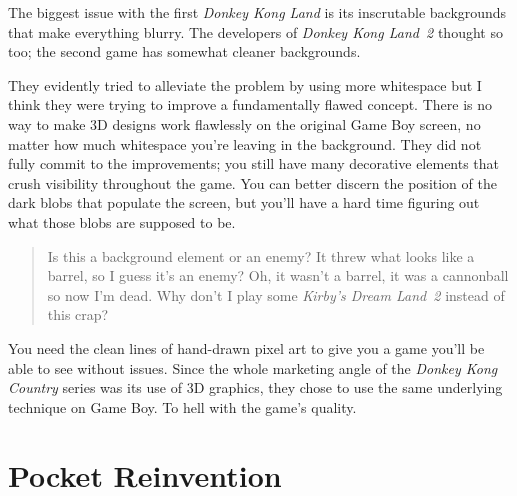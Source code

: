 \documentclass{book}
\let\oldcenter\center
\let\oldendcenter\endcenter
\renewenvironment{center}{\setlength\topsep{0pt}\oldcenter}{\oldendcenter}
\begin{document}
The biggest issue with the first \emph{Donkey Kong Land} is its inscrutable backgrounds that make everything blurry. The developers of \emph{Donkey Kong Land 2} thought so too; the second game has somewhat cleaner backgrounds.

\begin{center}
\vspace{8pt}
\quad\vspace{4pt}
\quad\vspace{4pt}
\quad\vspace{4pt}
\end{center}

They evidently tried to alleviate the problem by using more whitespace but I think they were trying to improve a fundamentally flawed concept. There is no way to make 3D designs work flawlessly on the original Game Boy screen, no matter how much whitespace you’re leaving in the background. They did not fully commit to the improvements; you still have many decorative elements that crush visibility throughout the game. You can better discern the position of the dark blobs that populate the screen, but you’ll have a hard time figuring out what those blobs are supposed to be.

\begin{quote}
Is this a background element or an enemy? It threw what looks like a barrel, so I guess it’s an enemy? Oh, it wasn’t a barrel, it was a cannonball so now I’m dead. Why don’t I play some \emph{Kirby’s Dream Land 2} instead of this crap?
\end{quote} \par

You need the clean lines of hand-drawn pixel art to give you a game you’ll be able to see without issues. Since the whole marketing angle of the \emph{Donkey Kong Country} series was its use of 3D graphics, they chose to use the same underlying technique on Game Boy. To hell with the game’s quality.

\FloatBarrier\needspace{5pt}\section*{Pocket Reinvention}\nopagebreak[4]
\end{document}
